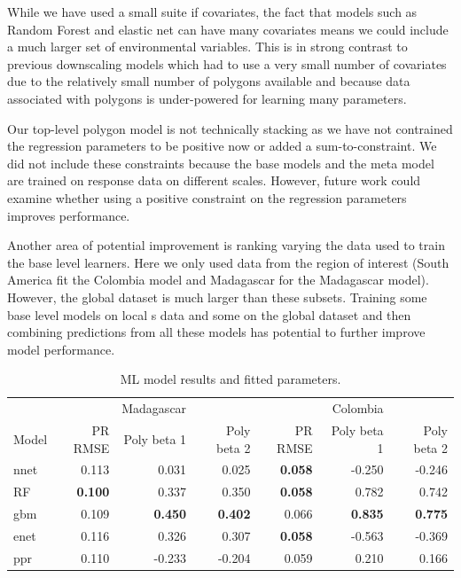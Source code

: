 \documentclass[11pt]{article}
\begin{document}
While we have used a small suite if covariates, the fact that models such as Random Forest and elastic net can have many covariates means we could include a much larger set of environmental variables.
This is in strong contrast to previous downscaling models which had to use a very small number of covariates due to the relatively small number of polygons available and because data associated with polygons is under-powered for learning many parameters.





Our top-level polygon model is not technically stacking as we have not contrained the regression parameters to be positive now or added a sum-to-constraint.
We did not include these constraints because the base models and the meta model are trained on response data on different scales.
However, future work could examine whether using a positive constraint on the regression parameters improves performance.

Another area of potential improvement is ranking varying the data used to train the base level learners.
Here we only used data from the region of interest (South America fit the Colombia model and Madagascar for the Madagascar model).
However, the global dataset is much larger than these subsets.
Training some base level models on local s data and some on the global dataset and then combining predictions from all these models has potential to further improve model performance.


 





\begin{table}
\caption{ML model results and fitted parameters. }
\centering
\begin{tabular}{l|rrr|rrr}
               &&      Madagascar &&      &                                     Colombia&    \\
Model          & PR RMSE & Poly beta 1 & Poly beta 2 & PR RMSE & Poly beta 1  & Poly beta 2\\
\hline
nnet           & 0.113      &  0.031         &  0.025         & \textbf{0.058}& -0.250          & -0.246          \\
RF   &  \textbf{0.100}      &  0.337         &  0.350         & \textbf{0.058}&  0.782          &  0.742          \\
gbm            & 0.109      &  \textbf{0.450}&  \textbf{0.402}& 0.066         &  \textbf{0.835} &  \textbf{0.775} \\
enet           & 0.116      &  0.326         &  0.307         & \textbf{0.058}& -0.563          & -0.369          \\
ppr            & 0.110      & -0.233         & -0.204         & 0.059         &  0.210          &  0.166          \\
\end{tabular}
\label{t:mlresults}
\end{table}
\end{document}
